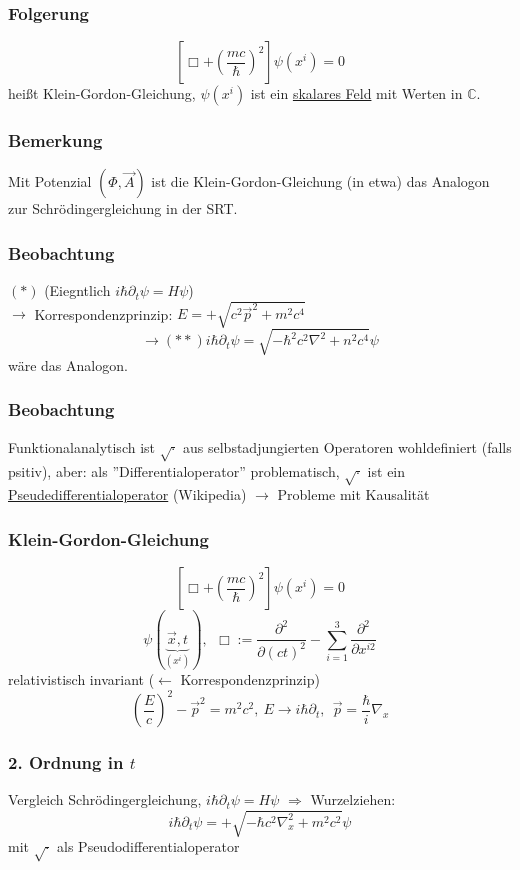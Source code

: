 \documentclass[twoside,a4paper]{scrartcl}
\newcommand{\C}{\mathbb{C}}
\renewcommand{\1}{\mathds{1}}
\newcommand{\Ra}{\Rightarrow}
\newcommand{\ra}{\rightarrow}
\newcommand{\la}{\leftarrow}
\renewcommand{\C}{\mathbb{C}}
\begin{document}
\subsubsection*{Folgerung}
$$[\Box+(\frac{mc}{\hbar})^2] \psi(x^i)=0$$
heißt Klein-Gordon-Gleichung, $\psi(x^i)$ ist ein \underline{skalares Feld} mit Werten in $\C$.
\subsubsection*{Bemerkung}
Mit Potenzial $(\Phi,\vec A)$ ist die Klein-Gordon-Gleichung (in etwa) das Analogon zur Schrödingergleichung in der SRT.
\subsubsection*{Beobachtung}
$(*)$ (Eiegntlich $i\hbar \partial_t \psi=H\psi$)\\
$\ra$ Korrespondenzprinzip: $E=+\sqrt{c^2\vec p^2+m^2c^4}$
$$\ra (**) i\hbar \partial_t \psi= \sqrt{-\hbar^2c^2\nabla^2+n^2c^4}\psi $$
wäre das Analogon.
\subsubsection*{Beobachtung}
Funktionalanalytisch ist $\sqrt{\cdot}$ aus selbstadjungierten Operatoren wohldefiniert (falls psitiv), aber:
als ''Differentialoperator'' problematisch, $\sqrt{\cdot}$ ist ein \underline{Pseudedifferentialoperator} (Wikipedia) $\ra$ Probleme mit Kausalität

% 

\subsubsection*{Klein-Gordon-Gleichung}
$$[\Box+(\frac{mc}{\hbar})^2] \psi(x^i)=0$$
$$\psi(\underbrace{\vec x,t}_{(x^i)}), \ \ \Box:=\frac{\partial^2}{\partial (ct)^2}-\sum_{i=1}^3 \frac{\partial^2}{\partial x^{i2}}$$
relativistisch invariant ($\la$ Korrespondenzprinzip)
$$(\frac{E}{c})^2-\vec p^2=m^2c^2, \ E \ra i\hbar \partial_t, \ \ \vec p=\frac{\hbar}{i}\nabla_x$$
\subsubsection*{2. Ordnung in $t$}
Vergleich Schrödingergleichung, $i\hbar \partial_t \psi=H\psi$ $\Ra$ Wurzelziehen:
$$i\hbar \partial_t \psi=+\sqrt{-\hbar c^2 \nabla_x^2+m^2c^2}\psi$$
mit $\sqrt{\cdot}$ als Pseudodifferentialoperator
\end{document}
